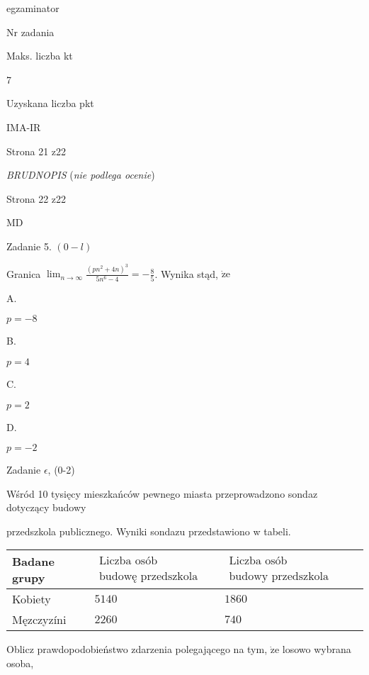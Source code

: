 \documentclass[a4paper,12pt]{article}
\begin{document}
egzaminator

Nr zadania

Maks. liczba kt

7

Uzyskana liczba pkt

IMA-IR

Strona 21 z22





{\it BRUDNOPIS} ({\it nie podlega ocenie})

Strona 22 z22

MD





Zadanie 5. $(0-l)$

Granica $\displaystyle \lim_{n\rightarrow\infty}\frac{(pn^{2}+4n)^{3}}{5n^{6}-4}=-\frac{8}{5}$. Wynika stąd, $\dot{\mathrm{z}}\mathrm{e}$

A.

$p=-8$

B.

$p=4$

C.

$p=2$

D.

$p=-2$

Zadanie $\epsilon$, (0-2)

Wśród 10 tysięcy mieszkańców pewnego miasta przeprowadzono sondaz dotyczący budowy

przedszkola publicznego. Wyniki sondaz$\mathrm{u}$ przedstawiono w tabeli.
\begin{center}
\begin{tabular}{|l|l|l|}
\hline
\multicolumn{1}{|l|}{Badane grupy}&	\multicolumn{1}{|l|}{$\begin{array}{l}\mbox{Liczba osób popierających}	\\	\mbox{budowę przedszkola}	\end{array}$}&	\multicolumn{1}{|l|}{$\begin{array}{l}\mbox{Liczba osób niepopierających}	\\	\mbox{budowy przedszkola}	\end{array}$}	\\
\hline
\multicolumn{1}{|l|}{Kobiety}&	\multicolumn{1}{|l|}{$5140$}&	\multicolumn{1}{|l|}{ $1860$}	\\
\hline
\multicolumn{1}{|l|}{Męzczyzíni}&	\multicolumn{1}{|l|}{$2260$}&	\multicolumn{1}{|l|}{ $740$}	\\
\hline
\end{tabular}

\end{center}
Oblicz prawdopodobieństwo zdarzenia polegającego na tym, $\dot{\mathrm{z}}\mathrm{e}$ losowo wybrana osoba,
\end{document}
